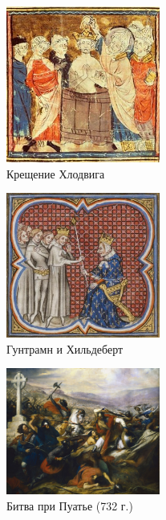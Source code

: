 \begin{figure}[ht]
    \centering
    \includegraphics[width=0.45\textwidth]{img/europe/clovis.jpg}
    \caption{Крещение Хлодвига}
    \label{fig:clovis}
\end{figure}

\begin{figure}[ht]
    \centering
    \includegraphics[width=0.45\textwidth]{img/europe/gunt.jpg}
    \caption{Гунтрамн и Хильдеберт}
    \label{fig:gunt}
\end{figure}

\begin{figure}[ht]
    \centering
    \includegraphics[width=0.45\textwidth]{img/europe/poitiers.png}
    \caption{Битва при Пуатье (732 г.)}
    \label{fig:poitiers}
\end{figure}

